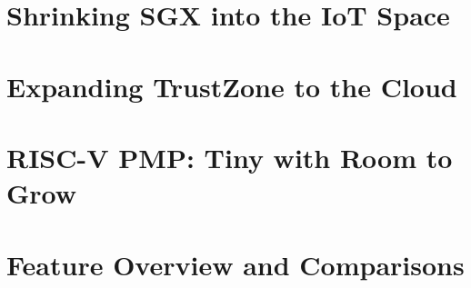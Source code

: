 \section{Shrinking SGX into the IoT Space}
\section{Expanding TrustZone to the Cloud}
\section{RISC-V PMP: Tiny with Room to Grow}
\section{Feature Overview and Comparisons}
